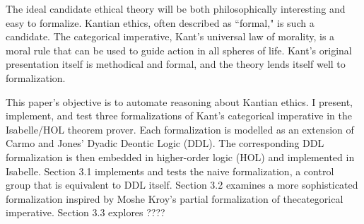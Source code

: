 \begin{isabellebody}
\begin{isamarkuptext}
The ideal candidate ethical theory will be both philosophically interesting and easy to 
formalize. Kantian ethics, often described as ``formal," is such a candidate. The categorical imperative,
Kant's universal law of morality, is a moral rule that can be used to guide action in all spheres of life.
Kant's original presentation itself is methodical and formal, and the theory lends itself well to 
formalization.

This paper's objective is to automate reasoning about Kantian ethics. I present, implement, and test
three formalizations of Kant's categorical imperative in the Isabelle/HOL theorem prover. Each 
formalization is modelled as an extension of Carmo and Jones' Dyadic Deontic Logic (DDL). The corresponding 
DDL formalization is then embedded in higher-order logic (HOL) and implemented in Isabelle. Section 
3.1 implements and tests the naive formalization, a control group that is equivalent to DDL 
itself. Section 3.2 examines a more sophisticated formalization inspired by Moshe Kroy's partial 
formalization of thecategorical imperative. Section 3.3 explores ????


\end{isamarkuptext}
\end{isabellebody}
